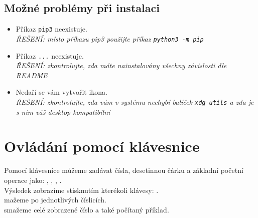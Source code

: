 \documentclass[a4paper, 12pt]{article}
\begin{document}
    \subsection{Možné problémy při instalaci}
    \begin{itemize}
        \item Příkaz \texttt{pip3} neexistuje. \\ \textit{ŘEŠENÍ: místo příkazu pip3 použijte příkaz \texttt{python3 -m pip}}
        \item Příkaz \texttt{...} neexistuje. \\ \textit{ŘEŠENÍ: zkontrolujte, zda máte nainstalovány všechny závislosti dle README}
        \item Nedaří se vám vytvořit ikona. \\ \textit{ŘEŠENÍ: zkontrolujte, zda vám v systému nechybí balíček \texttt{xdg-utils} a zda je s ním váš desktop kompatibilní} 
    \end{itemize}
                
                
        
                
\section{Ovládání pomocí klávesnice}
Pomocí klávesnice můžeme zadávat čísla, desetinnou čárku a základní početní operace jako: \keys{{+}}, \keys{{-}}, \keys{{*}}, \keys{{/}}. \\
Výsledek zobrazíme stisknutím kterékoli klávesy: \keys{\return}.\\
\keys{\backspace} mažeme po jednotlivých číslicích.\\
\keys{\delname} smažeme celé zobrazené číslo a také počítaný příklad.
\end{document}

